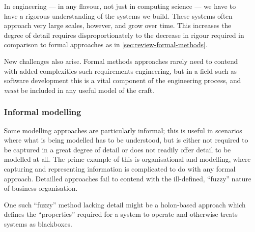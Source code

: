 In engineering --- in any flavour, not just in computing science --- we have to have a rigorous understanding of the systems we build. 
These systems often approach very large scales, however, and grow over time.
This increases the degree of detail requires disproportionately to the decrease in rigour required in comparison to formal approaches as in \ref{sec:review-formal-methods}.
\par

New challenges also arise. Formal methods approaches rarely need to contend with added complexities such requirements engineering, but in a field such as software development this is a vital component of the engineering process, and \emph{must} be included in any useful model of the craft.
\par


\subsubsection{Informal modelling}
Some modelling approaches are particularly informal; this is useful in scenarios where what is being modelled has to be understood, but is either not required to be captured in a great degree of detail or does not readily offer detail to be modelled at all.
The prime example of this is organisational and modelling, where capturing and representing information is complicated to do with any formal approach.
Detailled approaches fail to contend with the ill-defined, ``fuzzy'' nature of business organisation.
\par

One such ``fuzzy'' method lacking detail might be a holon-based approach which defines the ``properties'' required for a system to operate and otherwise treats systems as blackboxes. 
\par

